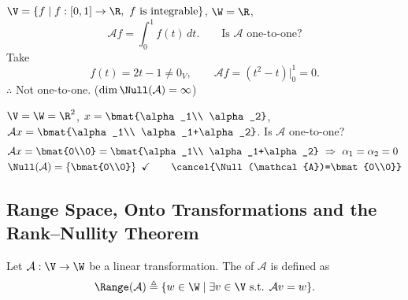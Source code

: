 \begin{example}\label{ex:integral-not-1-1}
$\V=\{f\mid f:[0,1]\to\R,\ f \text{ is integrable}\}$, \quad $\W=\R$,
\[
\mathcal{A}f=\int_0^1 f(t)\,dt. \qquad\text{Is } \mathcal{A} \text{ one-to-one?}
\]
Take
\[
f(t)=2t-1\ne 0_V, \qquad \mathcal{A}f=\left(t^2-t\right)\Big|_0^1=0.
\]
$\therefore$ Not one-to-one. \quad ($\dim\Null(\mathcal{A})=\infty$)
\end{example}

\begin{example}
$\V=\W=\R^2$, \quad $x=\bmat{\alpha_1\\ \alpha_2}$, \quad $\mathcal{A}x=\bmat{\alpha_1\\ \alpha_1+\alpha_2}$. \quad Is $\mathcal{A}$ one-to-one?
\begin{align*}
&\mathcal{A}x=\bmat{0\\0}=\bmat{\alpha_1\\ \alpha_1+\alpha_2} \ \Rightarrow\ \alpha_1=\alpha_2=0\\
&\Null(\mathcal{A})=\left\{\bmat{0\\0}\right\} \ \checkmark \qquad
\cancel{\Null(\mathcal{A})=\bmat{0\\0}}
\end{align*}
\end{example}

\subsection{Range Space, Onto Transformations and the Rank--Nullity Theorem}\label{ss:range}

\begin{definition}
Let $\mathcal{A}:\V\to\W$ be a linear transformation. The  of $\mathcal{A}$ is defined as
\[
\Range(\mathcal{A})\triangleq\{w\in\W\mid \exists v\in\V \text{ s.t. } \mathcal{A}v=w\}.
\]
\end{definition}

